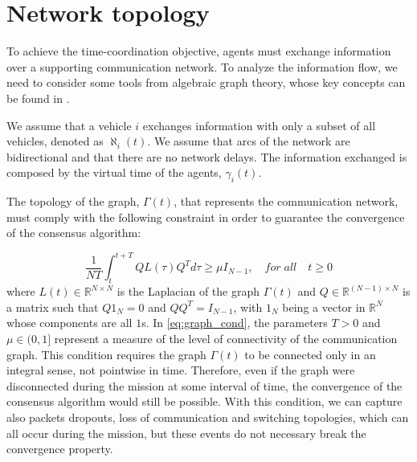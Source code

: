\section{Network topology\label{sec:network_topology}}

To achieve the time-coordination objective, agents must exchange information
over a supporting communication network.
To analyze the information flow, we need to consider some tools from algebraic graph
theory, whose key concepts can be found in \cite{graphBook}.

We assume that a vehicle $i$ exchanges information with only a subset of all
vehicles, denoted as $\aleph_i(t)$.
We assume that arcs of the network are bidirectional and that there are no
network delays.
The information exchanged is composed by the virtual time of the agents,
$\gamma_i(t)$.

The topology of the graph, $\Gamma(t)$, that represents the communication network,
must comply with the following constraint in order to guarantee the convergence
of the consensus algorithm:

\begin{equation}  \label{eq:graph_cond}
  \frac{1}{NT} \int_t^{t+T} Q L (\tau) Q^T d \tau \ge \mu I_{N-1}, \quad for \; all \quad t \ge 0
\end{equation}
where $L(t) \in \mathbb{R}^{N \times N}$ is the Laplacian of the graph $\Gamma(t)$
and $Q \in \mathbb{R}^{(N-1) \times N}$ is a matrix such that $Q 1_N = 0$ and
$QQ^T = I_{N-1}$, with $1_N$ being a vector in $\mathbb{R}^N$ whose components
are all $1$s.
In \eqref{eq:graph_cond}, the parameters $T > 0$ and $\mu \in (0,1]$ represent
a measure of the level of connectivity of the communication graph.
This condition requires the graph $\Gamma(t)$ to be connected only in an integral
sense, not pointwise in time. Therefore, even if the graph were disconnected during
the mission at some interval of time, the convergence of the consensus algorithm
would still be possible.
With this condition, we can capture also packets dropouts, loss of communication and
switching topologies, which can all occur during the mission, but these events do not necessary
break the convergence property.
